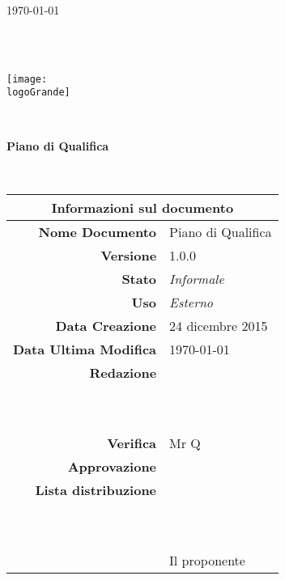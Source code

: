 \documentclass[12pt,a4paper]{article}
\title{\titoloDocumento}
\newcommand{\titoloDocumento}{Piano di Qualifica}
\newcommand{\dataCreazione}{24 dicembre 2015}
\newcommand{\versione}{1.0.0}
\newcommand{\stato}{Informale}
\newcommand{\uso}{Esterno}
\begin{document}
\begin{titlepage}
\begin{center}
\today \\
\vspace{1cm}
\begin{Huge}
\textbf{\nomeGruppo} \\
\end{Huge}
\textbf{\prjL} \\
\vspace{1cm}
\texttt{[image: \\logoGrande]}
\vspace{1cm}

\HRule \\[0.4cm]
\begin{Huge}
{\huge \bfseries \titoloDocumento}\\[0.4cm]
\end{Huge}
\HRule \\[1cm]
\vfill

\begin{table}[h]
\begin{center}
\begin{tabular}{r | l}
\multicolumn{2}{c}{\textbf{Informazioni sul documento}}\\
\midrule
\textbf{Nome Documento}	&	\titoloDocumento	\\
\textbf{Versione}	&	\versione	\\
\textbf{Stato}	&	\emph{\stato}	\\
\textbf{Uso}	&	\emph{\uso}	\\
\textbf{Data Creazione}	&	\dataCreazione	\\
\textbf{Data Ultima Modifica}	&	\today	\\
\textbf{Redazione}	& \AB \\
\ 	& \AVI \\
\ 	& \IB \\
\textbf{Verifica}	&	Mr Q	\\
\textbf{Approvazione}	& \IB \\
\textbf{Lista distribuzione}	&	\nomeGruppo	\\
\ 	&	\Vardanega	\\
\ 	&	\Cardin	\\
\ 	&	Il proponente \Zucchetti	\\

\end{tabular}
\end{center}
\end{table}

\end{center}
\end{titlepage}
\newpage
\end{document}
